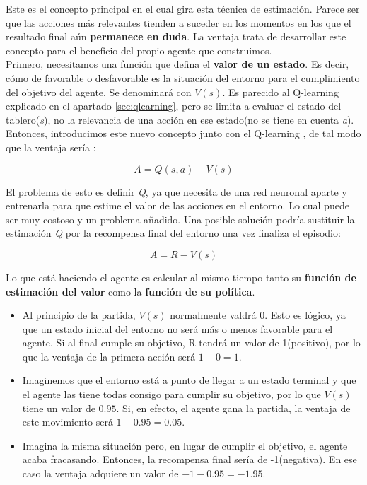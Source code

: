\documentclass[11pt,fleqn]{book} %
\begin{document}
Este es el concepto principal en el cual gira esta técnica de estimación. Parece ser que las acciones más relevantes tienden a suceder en los momentos en los que el resultado final aún \textbf{permanece en duda}. La ventaja trata de desarrollar este concepto para el beneficio del propio agente que construimos.\\

Primero, necesitamos una función que defina el \textbf{valor de un estado}. Es decir, cómo de favorable o desfavorable es la situación del entorno para el cumplimiento del objetivo del agente. Se denominará con $V(s)$. Es parecido al Q-learning explicado en el apartado \ref{sec:qlearning}, pero se limita a evaluar el estado del tablero(\textit{s}), no la relevancia de una acción en ese estado(no se tiene en cuenta \textit{a}). \\

Entonces, introducimos este nuevo concepto junto con el Q-learning , de tal modo que la ventaja sería :

\begin{equation*}
A = Q(s,a) - V(s)
\end{equation*}

El problema de esto es definir \textit{Q}, ya que necesita de una red neuronal aparte y entrenarla para que estime el valor de las acciones en el entorno. Lo cual puede ser muy costoso y un problema añadido. Una posible solución podría sustituir la estimación \textit{Q} por la recompensa final del entorno una vez finaliza el episodio:

\begin{equation*}
A = R - V(s)
\end{equation*}

Lo que está haciendo el agente es calcular al mismo tiempo tanto su \textbf{función de estimación del valor} como la \textbf{función de su política}. \\

\begin{itemize}
	
	\item Al principio de la partida, $V(s)$ normalmente valdrá 0. Esto es lógico, ya que un estado inicial del entorno no será más o menos favorable para el agente. Si al final cumple su objetivo, R tendrá un valor de 1(positivo), por lo que la ventaja de la primera acción será $1-0=1$. \\
	
	\item Imaginemos que el entorno está a punto de llegar a un estado terminal y que el agente las tiene todas consigo para cumplir su objetivo, por lo que $V(s)$ tiene un valor de $0.95$. Si, en efecto, el agente gana la partida, la ventaja de este movimiento será $1-0.95=0.05$. \\
	
	\item Imagina la misma situación pero, en lugar de cumplir el objetivo, el agente acaba fracasando. Entonces, la recompensa final sería de -1(negativa). En ese caso la ventaja adquiere un valor de $-1-0.95=-1.95$. \\
	
\end{itemize}
\end{document}
